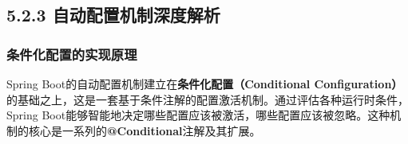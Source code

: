 \begin{Shaded}
\begin{Highlighting}[]
\KeywordTok{:}
\AttributeTok{  }\KeywordTok{:}
\AttributeTok{    }\KeywordTok{:}
\AttributeTok{    }\KeywordTok{:}\AttributeTok{ }\KeywordTok{[}\KeywordTok{]\{}\KeywordTok{\}}
\AttributeTok{    }\KeywordTok{:}
\AttributeTok{      }\KeywordTok{:}\AttributeTok{ }
\AttributeTok{      }
\KeywordTok{:}
\AttributeTok{  }\KeywordTok{:}
\AttributeTok{    }\KeywordTok{:}
\AttributeTok{    }\KeywordTok{:}
\AttributeTok{    }
\KeywordTok{:}
\AttributeTok{  }\KeywordTok{:}
\AttributeTok{    }\KeywordTok{:}
\AttributeTok{      }\KeywordTok{:}
\AttributeTok{        }\KeywordTok{:}
\AttributeTok{  }\KeywordTok{:}
\AttributeTok{    }\KeywordTok{:}
\AttributeTok{      }\KeywordTok{:}

\KeywordTok{:}
\AttributeTok{  }\KeywordTok{:}
\AttributeTok{    }\KeywordTok{:}\AttributeTok{ }
\end{Highlighting}
\end{Shaded}

\subsection{5.2.3 自动配置机制深度解析}\label{ux81eaux52a8ux914dux7f6eux673aux5236ux6df1ux5ea6ux89e3ux6790}

\subsubsection{条件化配置的实现原理}\label{ux6761ux4ef6ux5316ux914dux7f6eux7684ux5b9eux73b0ux539fux7406}

Spring Boot的自动配置机制建立在\textbf{条件化配置（Conditional Configuration）}的基础之上，这是一套基于条件注解的配置激活机制。通过评估各种运行时条件，Spring Boot能够智能地决定哪些配置应该被激活，哪些配置应该被忽略。这种机制的核心是一系列的\textbf{@Conditional}注解及其扩展。

